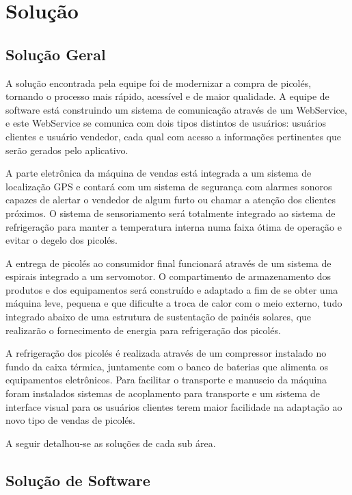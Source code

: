 \chapter{Solução}

\section{Solução Geral}

A solução encontrada pela equipe foi de modernizar a compra de picolés, tornando o processo mais rápido, acessível e de maior qualidade. A equipe de software está construindo um sistema de comunicação através de um WebService, e este WebService se comunica com dois tipos distintos de usuários: usuários clientes e usuário vendedor, cada qual com acesso a informações pertinentes que serão gerados pelo aplicativo.

A parte eletrônica da máquina de vendas está integrada a um sistema de localização GPS e contará com um sistema de segurança com alarmes sonoros capazes de alertar o vendedor de algum furto ou chamar a atenção dos clientes próximos. O sistema de sensoriamento será totalmente integrado ao sistema de refrigeração para manter a temperatura interna numa faixa ótima de operação e evitar o degelo dos picolés.

A entrega de picolés ao consumidor final funcionará através de um sistema de espirais integrado a um servomotor. O compartimento de armazenamento dos produtos e dos equipamentos será construído e adaptado a fim de se obter uma máquina leve, pequena e que dificulte a troca de calor com o meio externo, tudo integrado abaixo de uma estrutura de sustentação de painéis solares, que realizarão o fornecimento de energia para refrigeração dos picolés.

A refrigeração dos picolés é realizada através de um compressor instalado no fundo da caixa térmica,  juntamente com o banco de baterias que alimenta os equipamentos eletrônicos. Para facilitar o transporte e manuseio da máquina foram instalados sistemas de acoplamento para transporte e um sistema de interface visual para os usuários clientes terem maior facilidade na adaptação ao novo tipo de vendas de picolés.

A seguir detalhou-se as soluções de cada sub área.

\section{Solução de Software}


